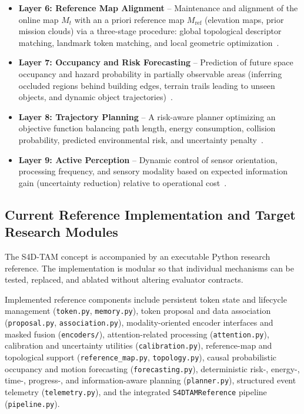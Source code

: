 \begin{itemize}
  \item \textbf{Layer 6: Reference Map Alignment} -- Maintenance and alignment of the online map $M_t$ with an a priori reference map $M_{\mathrm{ref}}$ (elevation maps, prior mission clouds) via a three-stage procedure: global topological descriptor matching, landmark token matching, and local geometric optimization~\cite{liu2022largescale, yue2025airground, radwan2024uav}.
  \item \textbf{Layer 7: Occupancy and Risk Forecasting} -- Prediction of future space occupancy and hazard probability in partially observable areas (inferring occluded regions behind building edges, terrain trails leading to unseen objects, and dynamic object trajectories)~\cite{yu2025driveoccworld, mei2025irwm, liao2025i2world, zheng2024gaussianad, liu2025hybrid}.
  \item \textbf{Layer 8: Trajectory Planning} -- A risk-aware planner optimizing an objective function balancing path length, energy consumption, collision probability, predicted environmental risk, and uncertainty penalty~\cite{cai2024neusis, yue2025airground, tordesillas2022faster}.
  \item \textbf{Layer 9: Active Perception} -- Dynamic control of sensor orientation, processing frequency, and sensory modality based on expected information gain (uncertainty reduction) relative to operational cost~\cite{pomianek2026s4dtam, tao2024active, tian2024same}.
\end{itemize}

\subsection{Current Reference Implementation and Target Research Modules}
\label{subsec:implementation_status}

The S4D-TAM concept is accompanied by an executable Python research reference. The implementation is modular so that individual mechanisms can be tested, replaced, and ablated without altering evaluator contracts.

Implemented reference components include persistent token state and lifecycle management (\texttt{token.py}, \texttt{memory.py}), token proposal and data association (\texttt{proposal.py}, \texttt{association.py}), modality-oriented encoder interfaces and masked fusion (\texttt{encoders/}), attention-related processing (\texttt{attention.py}), calibration and uncertainty utilities (\texttt{calibration.py}), reference-map and topological support (\texttt{reference\_map.py}, \texttt{topology.py}), causal probabilistic occupancy and motion forecasting (\texttt{forecasting.py}), deterministic risk-, energy-, time-, progress-, and information-aware planning (\texttt{planner.py}), structured event telemetry (\texttt{telemetry.py}), and the integrated \texttt{S4DTAMReference} pipeline (\texttt{pipeline.py}).

